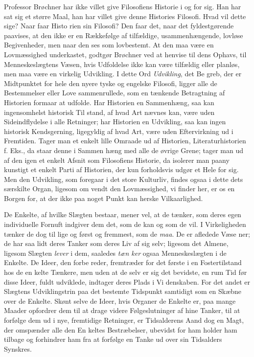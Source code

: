 \documentclass[12pt,a4paper,openany]{book}
\newcommand{\opage}[1]{\marginnote{\footnotesize\textit{[#1]}}}
\begin{document}
Professor Brøchner har ikke villet give Filosofiens Historie
i og for sig. Han har sat sig et større Maal, han har villet give
denne Histories Filosofi. Hvad vil dette sige? Naar faar Histo\-%
rien sin Filosofi? Den faar det, naar det fyldestgørende paavises,
at den ikke er en Rækkefølge af tilfældige, usammenhængende,
\opage{118}lovløse Begivenheder, men naar den ses som lovbestemt. At
den maa være en Lovmæssighed underkastet, godtgør Brøchner
ved at henvise til dens Ophavs, til Menneskeslægtens Væsen,
hvis Udfoldelse ikke kan være tilfældig eller planløs, men
maa være en virkelig Udvikling. I dette Ord \emph{Udvikling}, det Be\-%
greb, der er Midtpunktet for hele den nyere tyske og engelske
Filosofi, ligger alle de Bestemmelser eller Love sammenrullede,
som en tænkende Betragtning af Historien formaar at udfolde. Har
Historien en Sammenhæng, saa kan ingensomhelst historisk Til\-%
stand, af hvad Art nævnes kan, være uden Sideindflydelse i alle
Retninger; har Historien en Udvikling, saa kan ingen historisk
Kendsgerning, ligegyldig af hvad Art, være uden Eftervirkning
ud i Fremtiden. Tager man et enkelt lille Omraade ud af
Historien, Literaturhistorien f. Eks., da staar denne i Sammen\-%
hæng med alle de øvrige Grene; tager man ud af den igen et
enkelt Afsnit som Filosofiens Historie, da isolerer man paany
kunstigt et enkelt Parti af Historien, der kun forholdsvis udgør et
Hele for sig. Men den Udvikling, som foregaar i det store
Kulturliv, findes ogsaa i dette dets særskilte Organ, ligesom om\-%
vendt den Lovmæssighed, vi finder her, er os en Borgen for, at
der ikke paa noget Punkt kan herske Vilkaarlighed.

De Enkelte, af hvilke Slægten bestaar, mener vel, at de
tænker, som deres egen individuelle Fornuft indgiver dem det,
som de kan og som de vil. I Virkeligheden tænker de dog til\-%
lige og først og fremmest, som de \emph{maa}. De er afledede Væse\-%
ner; de har saa lidt deres Tanker som deres Liv af sig selv;
ligesom det Almene, ligesom Slægten \emph{lever} i dem, saaledes \emph{tæn\-%
ker} ogsaa Menneskeslægten i de Enkelte. De Ideer, den forbe\-%
reder, fremtræder for det første i en Fostertilstand hos de en\-%
kelte Tænkere, men uden at de selv er sig det bevidste, en rum
Tid før disse Ideer, fuldt udviklede, indtager deres Plads i Vi\-%
denskaben. For det andet er Slægtens Udviklingstrin paa det
bestemte Tidspunkt samtidigt som en Skæbne over de Enkelte.
Skønt selve de Ideer, hvis Organer de Enkelte er, paa mange
Maader opfordrer dem til at drage videre Følgeslutninger af
hine Tanker, til at forfølge dem ud i nye, fremtidige Retninger,
er Tidsalderens Aand dog en Magt, der omspænder alle den En\-%
keltes Bestræbelser, ubevidst for ham holder ham tilbage og
forhindrer ham fra at forfølge en Tanke ud over sin Tidsalders
Synskres.
\end{document}
